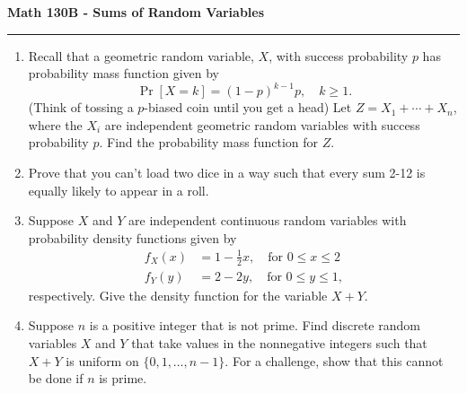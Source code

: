 \documentclass[11pt,letterpaper]{article}
\begin{document}
\begin{center}
{\bf \Large Math 130B - Sums of Random Variables}
\vspace{0.2cm}
\hrule
\end{center}

\begin{enumerate}
	\item Recall that a geometric random variable, $X$, with success probability $p$ has probability mass function given by
	\[
		\Pr[X = k] =  (1-p)^{k-1}p,\quad k\geq 1.
	\]
	(Think of tossing a $p$-biased coin until you get a head)
	Let $Z = X_1 + \cdots + X_n$, where the $X_i$ are independent geometric random variables with success probability $p$.
	Find the probability mass function for $Z$.
	\vfill

	\item Prove that you can't load two dice in a way such that every sum 2-12 is equally likely to appear in a roll.

	\vfill

	\item Suppose $X$ and $Y$ are independent continuous random variables with probability density functions given by
	\begin{align*}
		f_X(x) &= 1-\frac{1}{2}x,\quad \text{for }0\leq x \leq 2\\
		f_Y(y) &= 2-2y,\quad \text{for }0 \leq y\leq 1,		
	\end{align*}
	respectively.
	Give the density function for the variable $X+Y$.

	\vfill

	\item Suppose $n$ is a positive integer that is not prime. Find discrete random variables $X$ and $Y$ that take values in the nonnegative integers such that $X+Y$ is uniform on $\{0, 1, \ldots, n-1\}$.
	For a challenge, show that this cannot be done if $n$ is prime.
	\vfill
\end{enumerate}
\end{document}
